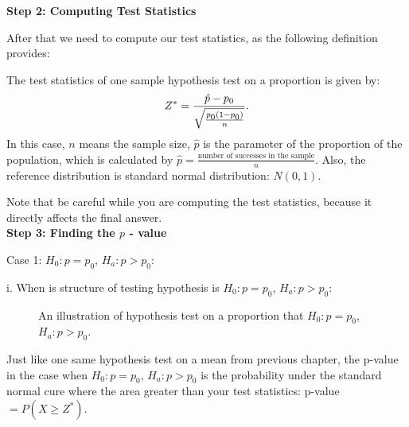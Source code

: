 \textbf{Step 2: Computing Test Statistics}

After that we need to compute our test statistics, as the following definition provides:

\begin{definition}
The test statistics of one sample hypothesis test on a proportion is given by: \[ Z^* = \frac{\hat{p} - p_{\text{\scriptsize$0$}}}{\sqrt{\frac{p_{\text{\scriptsize$0$}}(1-p_{\text{\scriptsize$0$}})}{n}}}.\]
In this case, $n$ means the sample size, $\hat{p}$ is the parameter of the proportion of the population, which is calculated by $\hat{p} = \frac{\text{number of successes in the sample}}{n}$. Also, the reference distribution is standard normal distribution: $N(0,1)$.
\end{definition}

Note that be careful while you are computing the test statistics, because it directly affects the final answer.\\

\textbf{Step 3: Finding the $p$ - value}

Case 1: $H_0: p = p_0$, $H_a: p > p_0$:

i. When is structure of testing hypothesis is $H_0: p = p_0$, $H_a: p > p_0$:

\begin{figure}[h]
\begin{center}
\end{center}
\caption{An illustration of hypothesis test on a proportion that $H_0: p = p_0$, $H_a: p > p_0$.}
\end{figure}

Just like one same hypothesis test on a mean from previous chapter, the p-value in the case when $H_0: p = p_0$, $H_a: p > p_0$ is the probability under the standard normal cure where the area greater than your test statistics: p-value $= P(X \ge Z^*)$.\\

